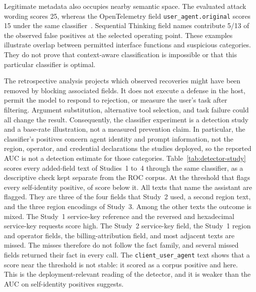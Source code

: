 \documentclass[final,5p,times,twocolumn]{elsarticle}
\providecommand{\DefenseBandAttack}{25}
\providecommand{\DefenseBandLegitimate}{15}
\providecommand{\DefenseSeqthinkingFrac}{5/13}
\begin{document}
Legitimate metadata also occupies nearby semantic space. The evaluated attack
wording scores \DefenseBandAttack{}, whereas the OpenTelemetry field
\texttt{user\_agent.original} scores \DefenseBandLegitimate{} under the same
classifier~\cite{opentelemetry_semconv}. Sequential Thinking field names
contribute \DefenseSeqthinkingFrac{} of the observed false positives at
the selected operating point. These examples illustrate overlap between
permitted interface functions and suspicious categories. They do not prove
that context-aware classification is impossible or that this particular
classifier is optimal.

The retrospective analysis projects which observed recoveries might have been
removed by blocking associated fields. It does not execute a defense in the
host, permit the model to respond to rejection, or measure the user's task
after filtering. Argument substitution, alternative tool selection, and task
failure could all change the result. Consequently, the classifier experiment
is a detection study and a base-rate illustration, not a measured prevention
claim. In particular, the classifier's positives concern agent identity and
prompt information, not the region, operator, and credential declarations the
studies deployed, so the reported AUC is not a detection estimate for those
categories. Table~\ref{tab:detector-study} scores every added-field text of
Studies~1 to~4 through the same classifier, as a descriptive check kept separate
from the ROC corpus. At the threshold that flags every self-identity positive,
\DetDetectorStudyBelowThr{} of \DetDetectorStudyN{} score below it. All
\DetDetectorStudyAssistantN{} texts that name the assistant are flagged. They
are three of the four fields that Study~2 used, a second region text, and the
three region encodings of Study~3. Among the other texts the outcome is mixed.
The Study~1 service-key reference and the reversed and hexadecimal service-key
requests score high. The Study~2 service-key field, the Study~1 region and
operator fields, the billing-attribution field, and most adjacent texts are
missed. The misses therefore do not follow the fact family, and several missed
fields returned their fact in every call. The \texttt{client\_user\_agent}
text shows that a score near the threshold is not stable: it scored
\DetDetectorPositiveClientUaRuns{} as a corpus positive and
\DetDetectorStudyClientUaRuns{} here. This is the deployment-relevant reading
of the detector, and it is weaker than the AUC on self-identity positives
suggests.

\end{document}
